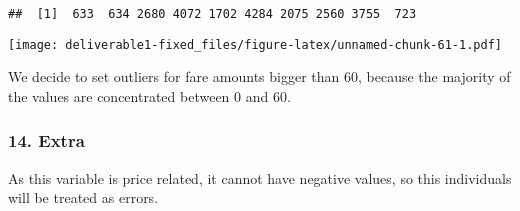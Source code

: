 \documentclass[
  18pt,
  a4paper]{article}
\newenvironment{Shaded}{\begin{snugshade}}{\end{snugshade}}
\newcommand{\CommentTok}[1]{\textcolor[rgb]{0.56,0.35,0.01}{\textit{#1}}}
\newcommand{\DataTypeTok}[1]{\textcolor[rgb]{0.13,0.29,0.53}{#1}}
\newcommand{\DecValTok}[1]{\textcolor[rgb]{0.00,0.00,0.81}{#1}}
\newcommand{\KeywordTok}[1]{\textcolor[rgb]{0.13,0.29,0.53}{\textbf{#1}}}
\newcommand{\NormalTok}[1]{#1}
\newcommand{\OperatorTok}[1]{\textcolor[rgb]{0.81,0.36,0.00}{\textbf{#1}}}
\newcommand{\OtherTok}[1]{\textcolor[rgb]{0.56,0.35,0.01}{#1}}
\newcommand{\StringTok}[1]{\textcolor[rgb]{0.31,0.60,0.02}{#1}}
\begin{document}
\begin{Shaded}
\end{Shaded}

\begin{verbatim}
##  [1]  633  634 2680 4072 1702 4284 2075 2560 3755  723
\end{verbatim}

\begin{Shaded}
\end{Shaded}

\texttt{[image: deliverable1-fixed\_files/figure-latex/unnamed-chunk-61-1.pdf]}

We decide to set outliers for fare amounts bigger than 60, because the
majority of the values are concentrated between 0 and 60.

\begin{Shaded}
\end{Shaded}

\hypertarget{extra}{%
\subsubsection{14. Extra}\label{extra}}

As this variable is price related, it cannot have negative values, so
this individuals will be treated as errors.
\end{document}
